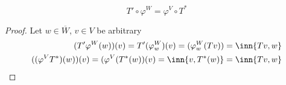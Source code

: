 \documentclass{mathnote}
\begin{document}
\begin{enumerate}
    \begin{theorem}
        \[T' \circ \varphi^W = \varphi^V \circ T^*\] 

    \end{theorem}

    \begin{proof}
        Let $w \in \overline{W}$, $v\in V$ be arbitrary
        \begin{align*}
            (T'\varphi^W(w))(v) = T'(\varphi^W_w)(v) = (\varphi^W_w(Tv)) = \inn{Tv,w}\\
            ((\varphi^VT^*)(w))(v) = (\varphi^V(T^*(w))(v)= \inn{v,T^*(w)} =\inn{Tv,w} 
        \end{align*}

    \end{proof}

    \end{enumerate}    
\end{document}
